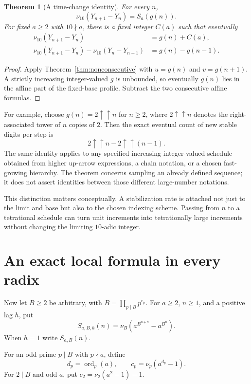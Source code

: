 \documentclass[11pt,a4paper]{article}
\newtheorem{theorem}{Theorem}[section]
\theoremstyle{definition}
\newcommand{\ord}{\operatorname{ord}}
\begin{document}
\begin{theorem}[A time-change identity]\label{thm:time-change}
For every $n$,
\[
\nu_{10}(Y_{n+1}-Y_n)=S_a(g(n)).
\]
For fixed $a\ge2$ with $10\nmid a$, there is a fixed integer $C(a)$ such
that eventually
\begin{align}
\nu_{10}(Y_{n+1}-Y_n)&=g(n)+C(a),\label{eq:time-count}\\
\nu_{10}(Y_{n+1}-Y_n)-\nu_{10}(Y_n-Y_{n-1})
&=g(n)-g(n-1).\label{eq:time-speed}
\end{align}
\end{theorem}
\begin{proof}
Apply Theorem~\ref{thm:nonconsecutive} with $u=g(n)$ and $v=g(n+1)$.
A strictly increasing integer-valued $g$ is unbounded, so eventually
$g(n)$ lies in the affine part of the fixed-base profile.
Subtract the two consecutive affine formulas.
\end{proof}

For example, choose $g(n)=2\uparrow\uparrow n$ for $n\ge2$, where
$2\uparrow\uparrow n$ denotes the right-associated tower of $n$ copies of
$2$. Then the exact eventual count of new stable digits per step is
\[
2\uparrow\uparrow n-2\uparrow\uparrow(n-1).
\]
The same identity applies to any specified increasing integer-valued
schedule obtained from higher up-arrow expressions, a chain notation, or a
chosen fast-growing hierarchy. The theorem concerns sampling an already
defined sequence; it does not assert identities between those different
large-number notations.

This distinction matters conceptually. A stabilization rate is attached
not just to the limit and base but also to the chosen indexing scheme.
Passing from $n$ to a tetrational schedule can turn unit increments into
tetrationally large increments without changing the limiting $10$-adic
integer.

\section{An exact local formula in every radix}\label{sec:radix}

Now let $B\ge2$ be arbitrary, with
$B=\prod_{p\mid B}p^{e_p}$. For $a\ge2$, $n\ge1$, and a positive lag $h$,
put
\[
S_{a,B,h}(n)=\nu_B\!\left(a^{B^{n+h}}-a^{B^n}\right).
\]
When $h=1$ write $S_{a,B}(n)$.

For an odd prime $p\mid B$ with $p\nmid a$, define
\[
d_p=\ord_p(a),\qquad c_p=\nu_p(a^{d_p}-1).
\]
For $2\mid B$ and odd $a$, put $c_2=\nu_2(a^2-1)-1$.
\end{document}
